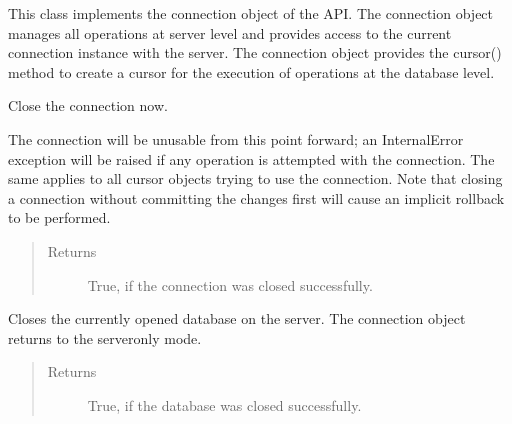 \documentclass[letterpaper,10pt,english]{sphinxmanual}
\begin{document}
\begin{fulllineitems}
\label{\detokenize{index:secondodb.api.secondoapi.Connection}}
This class implements the connection object of the  API. The connection object manages all operations at server
level and provides access to the current connection instance with the server. The connection object provides the
cursor() method to create a cursor for the execution of operations at the database level.

\begin{fulllineitems}
\label{\detokenize{index:secondodb.api.secondoapi.Connection.close}}
Close the connection now.

The connection will be unusable from this point forward; an InternalError exception will be raised if any
operation is attempted with the connection. The same applies to all cursor objects trying to use the connection.
Note that closing a connection without committing the changes first will cause an implicit rollback to be
performed.
\begin{quote}\begin{description}
\item[{Returns}] \leavevmode
True, if the connection was closed successfully.

\end{description}\end{quote}

\end{fulllineitems}


\begin{fulllineitems}
\label{\detokenize{index:secondodb.api.secondoapi.Connection.close_database}}
Closes the currently opened database on the  server. The connection object returns to the server\sphinxhyphen{}only
mode.
\begin{quote}\begin{description}
\item[{Returns}] \leavevmode
True, if the database was closed successfully.


\end{description}
\end{quote}
\end{fulllineitems}
\end{fulllineitems}
\end{document}
